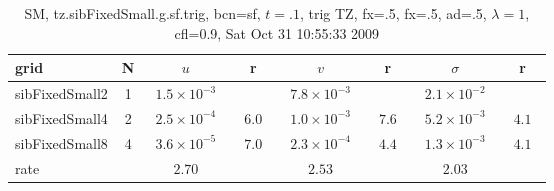 \begin{table}[hbt]\tableFont %
\begin{center}
\begin{tabular}{|l|c|c|c|c|c|c|c|} \hline 
grid  & N &  $u$  & r &  $v$  & r &  $\sigma$   & r \\ \hline 
      sibFixedSmall2 &     1 & ~$1.5\times10^{ -3}$~ &           & ~$7.8\times10^{ -3}$~ &           & ~$2.1\times10^{ -2}$~ &            \\ \hline
      sibFixedSmall4 &     2 & ~$2.5\times10^{ -4}$~ & ~$  6.0$~ & ~$1.0\times10^{ -3}$~ & ~$  7.6$~ & ~$5.2\times10^{ -3}$~ & ~$  4.1$~  \\ \hline
      sibFixedSmall8 &     4 & ~$3.6\times10^{ -5}$~ & ~$  7.0$~ & ~$2.3\times10^{ -4}$~ & ~$  4.4$~ & ~$1.3\times10^{ -3}$~ & ~$  4.1$~  \\ \hline
    rate             &       &       $2.70$         &       &       $2.53$         &       &       $2.03$         &        \\ \hline
\end{tabular}
\caption{SM, tz.sibFixedSmall.g.sf.trig, bcn=sf, $t=.1$, trig TZ, fx=.5, fx=.5, ad=.5, $\lambda=1$, cfl=0.9,  Sat Oct 31 10:55:33 2009}\label{table:tz.sibFixedSmall.g.sf.trig}
\end{center}
\end{table}
